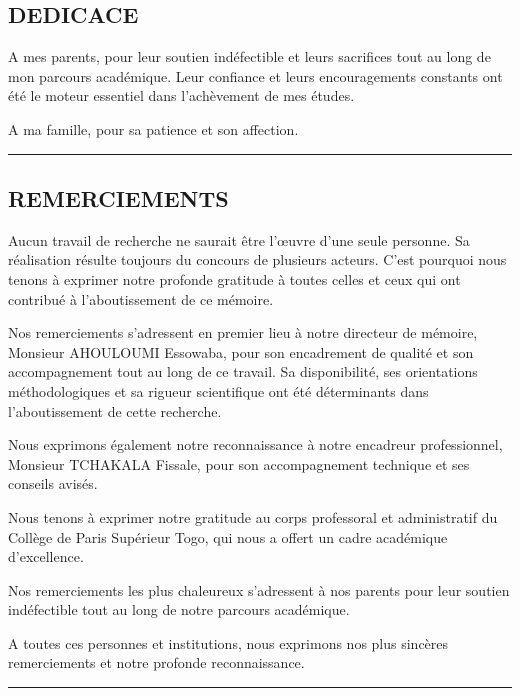 \documentclass[
  12pt,
]{article}
\begin{document}
\subsection{DEDICACE}\label{dedicace}

A mes parents, pour leur soutien indéfectible et leurs sacrifices tout
au long de mon parcours académique. Leur confiance et leurs
encouragements constants ont été le moteur essentiel dans l’achèvement
de mes études.

A ma famille, pour sa patience et son affection.

\begin{center}\rule{0.5\linewidth}{0.5pt}\end{center}

\subsection{REMERCIEMENTS}\label{remerciements}

Aucun travail de recherche ne saurait être l’œuvre d’une seule personne.
Sa réalisation résulte toujours du concours de plusieurs acteurs. C’est
pourquoi nous tenons à exprimer notre profonde gratitude à toutes celles
et ceux qui ont contribué à l’aboutissement de ce mémoire.

Nos remerciements s’adressent en premier lieu à notre directeur de
mémoire, Monsieur AHOULOUMI Essowaba, pour son encadrement de qualité et
son accompagnement tout au long de ce travail. Sa disponibilité, ses
orientations méthodologiques et sa rigueur scientifique ont été
déterminants dans l’aboutissement de cette recherche.

Nous exprimons également notre reconnaissance à notre encadreur
professionnel, Monsieur TCHAKALA Fissale, pour son accompagnement
technique et ses conseils avisés.

Nous tenons à exprimer notre gratitude au corps professoral et
administratif du Collège de Paris Supérieur Togo, qui nous a offert un
cadre académique d’excellence.

Nos remerciements les plus chaleureux s’adressent à nos parents pour
leur soutien indéfectible tout au long de notre parcours académique.

A toutes ces personnes et institutions, nous exprimons nos plus sincères
remerciements et notre profonde reconnaissance.

\begin{center}\rule{0.5\linewidth}{0.5pt}\end{center}
\end{document}
